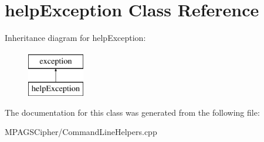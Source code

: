 \hypertarget{classhelp_exception}{\section{help\-Exception Class Reference}
\label{classhelp_exception}
}
Inheritance diagram for help\-Exception\-:\begin{figure}[H]
\begin{center}
\leavevmode
\includegraphics[height=2.000000cm]{classhelp_exception}
\end{center}
\end{figure}


The documentation for this class was generated from the following file\-:\begin{DoxyCompactItemize}
\item 
M\-P\-A\-G\-S\-Cipher/Command\-Line\-Helpers.\-cpp\end{DoxyCompactItemize}
